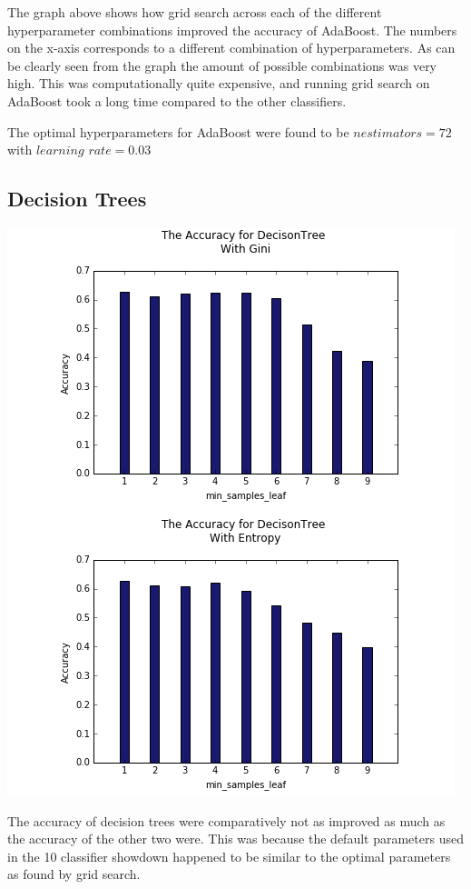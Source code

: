 \documentclass{article}
\begin{document}
The graph above shows how grid search across each of the different hyperparameter combinations improved the accuracy of AdaBoost. The numbers on the x-axis corresponds to a different combination of hyperparameters. As can be clearly seen from the graph the amount of possible combinations was very high. This was computationally quite expensive, and running grid search on AdaBoost took a long time compared to the other classifiers. 

The optimal hyperparameters for AdaBoost were found to be $n$\textunderscore $estimators = 72$ with $learning$ \textunderscore $rate = 0.03$

\subsection{Decision Trees}


\includegraphics[scale=0.6]{d_trees_crop}

The accuracy of decision trees were comparatively not as improved as much as the accuracy of the other two were. This was because the default parameters used in the 10 classifier showdown \cite{showdown} happened to be similar to the optimal parameters as found by grid search. 
\end{document}
